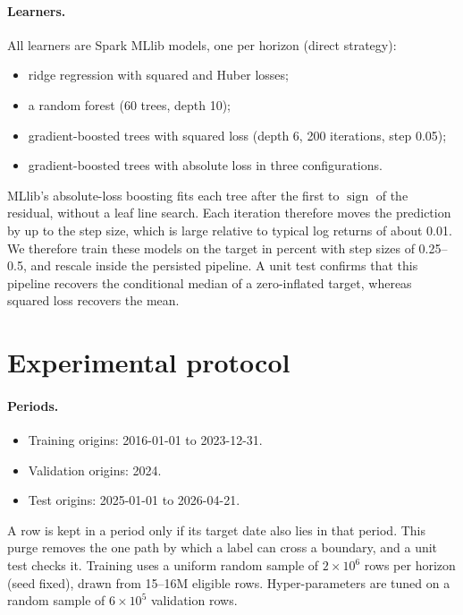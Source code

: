 \paragraph{Learners.}
All learners are Spark MLlib models, one per horizon (direct strategy):
\begin{itemize}
  \item ridge regression with squared and Huber losses;
  \item a random forest (60 trees, depth 10);
  \item gradient-boosted trees with squared loss (depth 6, 200 iterations, step 0.05);
  \item gradient-boosted trees with absolute loss in three configurations.
\end{itemize}
MLlib's absolute-loss boosting fits each tree after the first to $\operatorname{sign}$ of the residual, without a leaf line search.
Each iteration therefore moves the prediction by up to the step size, which is large relative to typical log returns of about 0.01.
We therefore train these models on the target in percent with step sizes of 0.25--0.5, and rescale inside the persisted pipeline.
A unit test confirms that this pipeline recovers the conditional median of a zero-inflated target, whereas squared loss recovers the mean.

\section{Experimental protocol}\label{sec:protocol}

\paragraph{Periods.}
\begin{itemize}
  \item Training origins: 2016-01-01 to 2023-12-31.
  \item Validation origins: 2024.
  \item Test origins: 2025-01-01 to 2026-04-21.
\end{itemize}
A row is kept in a period only if its target date also lies in that period.
This purge removes the one path by which a label can cross a boundary, and a unit test checks it.
Training uses a uniform random sample of $2\times10^6$ rows per horizon (seed fixed), drawn from 15--16M eligible rows.
Hyper-parameters are tuned on a random sample of $6\times10^5$ validation rows.

